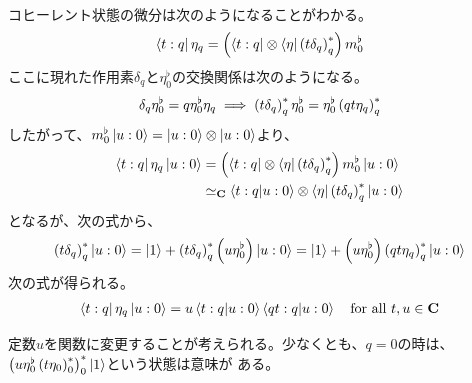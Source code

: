 {\begin{equation*}
\begin{split}
	\end{split}\end{equation*}
	コヒーレント状態の微分は次のようになることがわかる。
	\begin{equation*}\begin{split}
		\bra{t:q}\eta_q 
		= \plr{\bra{t:q}\otimes\bra{\eta}\plr{t\delta_q}_q^*}m_0^\flat
	\end{split}\end{equation*}
	ここに現れた作用素$\delta_q$と$\eta_0^\flat$の交換関係は次のようになる。
	\begin{equation*}\begin{split}
		\delta_q\eta_0^\flat = q\eta_0^\flat\eta_q
		\implies \plr{t\delta_q}_q^*\eta_0^\flat = \eta_0^\flat\plr{qt\eta_q}_q^*
	\end{split}\end{equation*}
	したがって、$m_0^\flat\ket{u:0} = \ket{u:0}\otimes\ket{u:0}$より、
	\begin{equation*}\begin{split}
		\bra{t:q}\eta_q\ket{u:0}
		&= \plr{\bra{t:q}\otimes\bra{\eta}\plr{t\delta_q}_q^*}m_0^\flat
			\ket{u:0} \\
		&\simeq_\fukuso \braket{t:q|u:0}\otimes\braket{\eta|\plr{t\delta_q}_q^*|u:0}
	\end{split}\end{equation*}
	となるが、次の式から、
	\begin{equation*}\begin{split}
		\plr{t\delta_q}_q^*\ket{u:0} = \ket{1} 
			+ \plr{t\delta_q}_q^*\plr{u\eta_0^\flat}\ket{u:0}
		= \ket{1} + \plr{u\eta_0^\flat}\plr{qt\eta_q}_q^*\ket{u:0}
	\end{split}\end{equation*}
	次の式が得られる。
	\begin{equation*}\begin{split}
		\bra{t:q}\eta_q\ket{u:0} = u\braket{t:q|u:0}\braket{qt:q|u:0}
		\quad\text{for all } t,u\in\fukuso
	\end{split}\end{equation*}

	\begin{todo}[式の変形]\label{todo:式の変形} %
		定数$u$を関数に変更することが考えられる。少なくとも、$q=0$の時は、
		$\plr{u\eta_0^\flat\plr{t\eta_0}_0^*}_0^*\ket{1}$という状態は意味が
		ある。
	\end{todo} %
}
